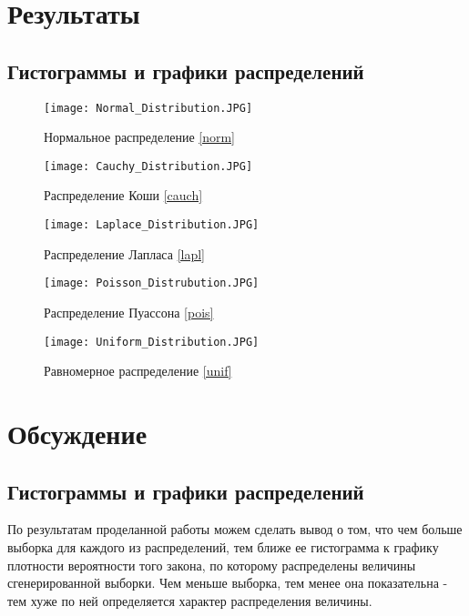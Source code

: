 \documentclass[a4paper]{article}
\begin{document}
\section{Результаты}
    \subsection{Гистограммы и графики распределений}
        \begin{figure}[H]
            \centering
            \texttt{[image: Normal\_Distribution.JPG]}
            \caption{Нормальное распределение \eqref{norm}}
            \label{fig:normal}
        \end{figure}
        
        \begin{figure}[H]
            \centering
            \texttt{[image: Cauchy\_Distribution.JPG]}
            \caption{Распределение Коши \eqref{cauch}}
            \label{fig:cauchy}
        \end{figure}
        
        \begin{figure}[H]
            \centering
            \texttt{[image: Laplace\_Distribution.JPG]}
            \caption{Распределение Лапласа \eqref{lapl}}
            \label{fig:laplace}
        \end{figure}
        
        \begin{figure}[H]
            \centering
            \texttt{[image: Poisson\_Distrubution.JPG]}
            \caption{Распределение Пуассона \eqref{pois}}
            \label{fig:poisson}
        \end{figure}
        
        \begin{figure}[H]
            \centering
            \texttt{[image: Uniform\_Distribution.JPG]}
            \caption{Равномерное распределение \eqref{unif}}
            \label{fig:uniform}
        \end{figure}

    
\section{Обсуждение}
    \subsection{Гистограммы и графики распределений}
        По результатам проделанной работы можем сделать вывод о том, что чем
больше выборка для каждого из распределений, тем ближе ее гистограмма
к графику плотности вероятности того закона, по которому распределены
величины сгенерированной выборки. Чем меньше выборка, тем менее она
показательна - тем хуже по ней определяется характер распределения величины.
        
\end{document}
